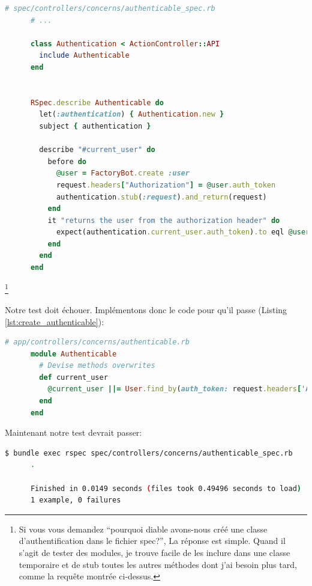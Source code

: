 \documentclass[]{report}
\begin{document}
    \begin{scriptsize}
      \begin{lstlisting}[language=ruby]
      # spec/controllers/concerns/authenticable_spec.rb
      # ...

      class Authentication < ActionController::API
        include Authenticable
      end


      RSpec.describe Authenticable do
        let(:authentication) { Authentication.new }
        subject { authentication }

        describe "#current_user" do
          before do
            @user = FactoryBot.create :user
            request.headers["Authorization"] = @user.auth_token
            authentication.stub(:request).and_return(request)
          end
          it "returns the user from the authorization header" do
            expect(authentication.current_user.auth_token).to eql @user.auth_token
          end
        end
      end
      \end{lstlisting}
    \end{scriptsize}
    \footnote{Si vous vous demandez \enquote{pourquoi diable avons-nous créé une classe d'authentification dans le fichier spec?}, La réponse est simple. Quand il s'agit de tester des modules, je trouve facile de les inclure dans une classe temporaire et de stub toutes les autres méthodes dont j'ai besoin plus tard, comme la requête montrée ci-dessus.}

    Notre test doit échouer. Implémentons donc le code pour qu'il passe (Listing \ref{lst:create_authenticable}):

    \begin{scriptsize}
      \begin{lstlisting}[language=ruby, caption={Implémentation de la méthode current\_user}, label={lst:create_authenticable}]
      # app/controllers/concerns/authenticable.rb
      module Authenticable
        # Devise methods overwrites
        def current_user
          @current_user ||= User.find_by(auth_token: request.headers['Authorization'])
        end
      end
      \end{lstlisting}
    \end{scriptsize}

    Maintenant notre test devrait passer:

    \begin{scriptsize}
      \begin{lstlisting}[language=bash]
      $ bundle exec rspec spec/controllers/concerns/authenticable_spec.rb
      .

      Finished in 0.0149 seconds (files took 0.49496 seconds to load)
      1 example, 0 failures
      \end{lstlisting}
    \end{scriptsize}
\end{document}
